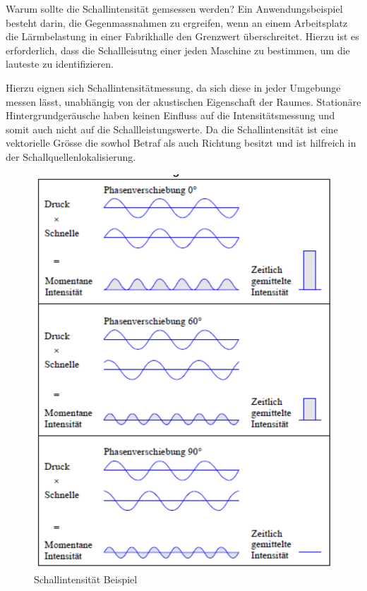 Warum sollte die Schallintensität gemsessen werden? Ein Anwendungsbeispiel besteht darin, die Gegenmassnahmen zu ergreifen, wenn an einem Arbeitsplatz die Lärmbelastung in einer Fabrikhalle den Grenzwert überschreitet. Hierzu ist es erforderlich, dass die Schallleisutng einer jeden Maschine zu bestimmen, um die lauteste zu identifizieren.  \newline

Hierzu eignen sich Schallintensitätmessung, da sich diese in jeder Umgebunge messen lässt, unabhängig von der akustischen Eigenschaft der Raumes. Stationäre Hintergrundgeräusche haben keinen Einfluss auf die Intensitätsmessung und somit auch nicht auf die Schallleistungswerte. Da die Schallintensität ist eine vektorielle Grösse die sowhol Betraf als auch Richtung besitzt und ist hilfreich in der Schallquellenlokalisierung.

\begin{figure}[h!]
	\centering
	\includegraphics[scale=0.5]{papers/helmholtz/images/Schallintensitaet.png}
	\caption{Schallintensität Beispiel}
	\label{fig:Schallintensitaet}
\end{figure}

